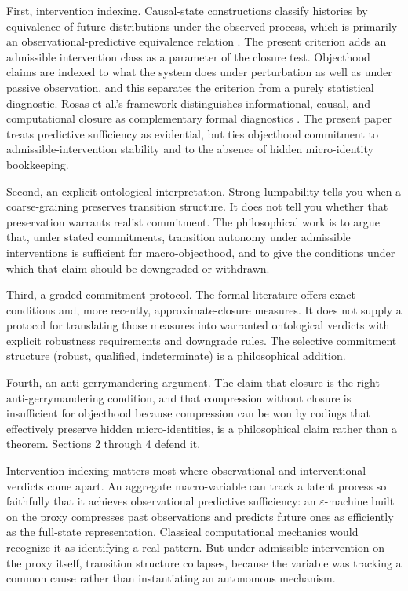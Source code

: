 First, intervention indexing. Causal-state constructions classify
histories by equivalence of future distributions under the observed
process, which is primarily an observational-predictive equivalence
relation \citep{shalizi2001}. The present criterion adds an
admissible intervention class as a parameter of the closure test.
Objecthood claims are indexed to what the system does under
perturbation as well as under passive observation, and this separates
the criterion from a purely statistical diagnostic.
Rosas et al.'s framework distinguishes informational, causal, and
computational closure as complementary formal diagnostics
\citep{rosas2024}. The present paper treats predictive sufficiency as
evidential, but ties objecthood commitment to admissible-intervention
stability and to the absence of hidden micro-identity bookkeeping.

Second, an explicit ontological interpretation. Strong lumpability tells
you when a coarse-graining preserves transition structure. It does not
tell you whether that preservation warrants realist commitment. The
philosophical work is to argue that, under stated commitments,
transition autonomy under admissible interventions is sufficient for
macro-objecthood, and to give the conditions under which that claim
should be downgraded or withdrawn.

Third, a graded commitment protocol. The formal literature offers exact
conditions and, more recently, approximate-closure measures. It does not
supply a protocol for translating those measures into warranted
ontological verdicts with explicit robustness requirements and downgrade
rules. The selective commitment structure (robust, qualified,
indeterminate) is a philosophical addition.

Fourth, an anti-gerrymandering argument. The claim that closure is
the right anti-gerrymandering condition, and that compression without
closure is insufficient for objecthood because compression can be won by
codings that effectively preserve hidden micro-identities, is a
philosophical claim rather than a theorem. Sections 2 through 4 defend it.

Intervention indexing matters most where observational and
interventional verdicts come apart. An aggregate
macro-variable can track a latent process so faithfully that it achieves
observational predictive sufficiency: an \(\varepsilon\)-machine built
on the proxy compresses past observations and predicts future ones as
efficiently as the full-state representation. Classical computational
mechanics would recognize it as identifying a real pattern. But under
admissible intervention on the proxy itself, transition structure
collapses, because the variable was tracking a common cause rather than
instantiating an autonomous mechanism.

